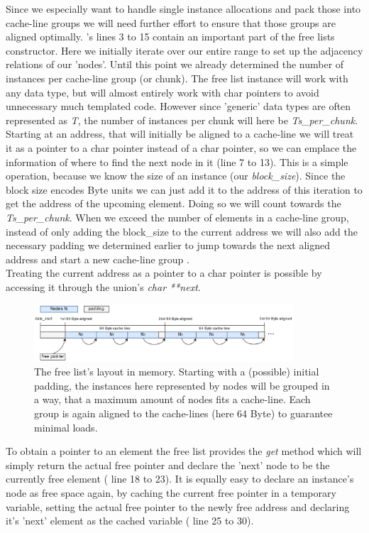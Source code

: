 Since we especially want to handle single instance allocations and pack those into cache-line groups we will need further effort to ensure that those groups are aligned optimally. 's lines 3 to 15 contain an important part of the free lists constructor. Here we initially iterate over our entire range to set up the adjacency relations of our 'nodes'. Until this point we already determined the number of instances per cache-line group (or chunk). The free list instance will work with any data type, but will almost entirely work with char pointers to avoid unnecessary much templated code. However since 'generic' data types are often represented as \textit{T}, the number of instances per chunk will here be \textit{Ts\_per\_chunk}.\\
Starting at an address, that will initially be aligned to a cache-line we will treat it as a pointer to a char pointer instead of a char pointer, so we can emplace the information of where to find the next node in it (line 7 to 13). This is a simple operation, because we know the size of an instance (our \textit{block\_size}). Since the block size encodes Byte units we can just add it to the address of this iteration to get the address of the upcoming element. Doing so we will count towards the \textit{Ts\_per\_chunk}. When we exceed the number of elements in a cache-line group, instead of only adding the block\_size to the current address we will also add the necessary padding we determined earlier to jump towards the next aligned address and start a new cache-line group .\\
Treating the current address as a pointer to a char pointer is possible by accessing it through the union's \textit{char **next}. 
\begin{figure}[!htbp]
	\centering
	\includegraphics[width=0.86\textwidth, height=0.3\textwidth]{PICs/free_list_in_memory}
	\caption{The free list's layout in memory. Starting with a (possible) initial padding, the instances here represented by nodes will be grouped in a way, that a maximum amount of nodes fits a cache-line. Each group is again aligned to the cache-lines (here 64 Byte) to guarantee minimal loads.}
	\label{free_list_in_memory}
\end{figure}
To obtain a pointer to an element the free list provides the \textit{get} method which will simply return the actual free pointer and declare the 'next' node to be the currently free element ( line 18 to 23). It is equally easy to declare an instance's node as free space again, by caching the current free pointer in a temporary variable, setting the actual free pointer to the newly free address and declaring it's 'next' element as the cached variable ( line 25 to 30).

